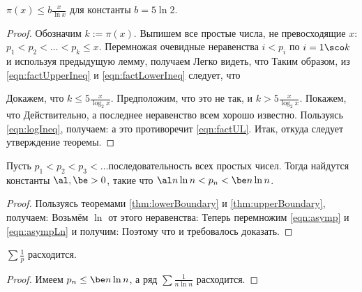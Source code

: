 \documentclass[a4paper]{article}
\begin{document}
\begin{theorem}\label{thm:upperBoundary}
$\pi(x)\le b\frac{x}{\ln x}$ для  константы $b = 5\ln2$.
\end{theorem}
\begin{proof}
Обозначим $k := \pi(x)$.  Выпишем все простые числа, не превосходящие $x$: $p_1<p_2<\ldots<p_k\le x$.
Перемножая очевидные неравенства $i < p_i$ по $i = 1\sco k$ и используя предыдущую лемму, получаем
Легко видеть, что
Таким образом, из \eqref{eqn:factUpperIneq} и \eqref{eqn:factLowerIneq} следует, что

Докажем, что $k\le5\frac{x}{\log_2 x}$. Предположим, что это не так, и $k> 5\frac{x}{\log_2 x}$. Покажем, что
Действительно,
а последнее неравенство всем хорошо известно.
Пользуясь \eqref{eqn:logIneq}, получаем:
а это противоречит \eqref{eqn:factUL}.
Итак,
откуда следует утверждение теоремы.
\end{proof}

\begin{imp}
Пусть $p_1<p_2<p_3<\ldots$\т последовательность всех простых чисел. Тогда найдутся константы $\al, \be > 0$, такие что
$\al n\ln n<p_n<\be n\ln n$.
\end{imp}
\begin{proof} Пользуясь теоремами \ref{thm:lowerBoundary} и \ref{thm:upperBoundary}, получаем:
Возьмём $\ln$ от этого неравенства:
Теперь перемножим \eqref{eqn:asymp} и \eqref{eqn:asympLn} и получим:
Поэтому
что и требовалось доказать.
\end{proof}

\begin{imp}
    $\sum\frac1p$ расходится.
\end{imp}
\begin{proof}
    Имеем $p_n\le\be n\ln n$, а ряд $\sum \frac1{n\ln n}$ расходится.
\end{proof}
\end{document}
